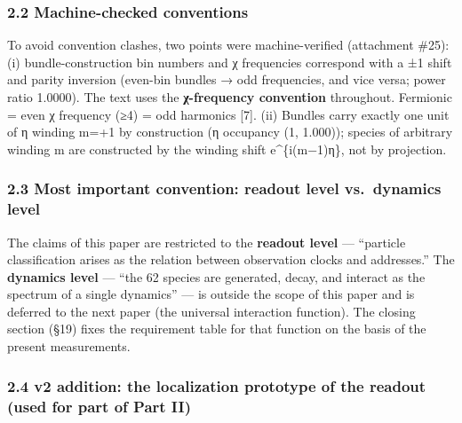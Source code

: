 \documentclass[
]{article}
\begin{document}
\subsubsection{2.2 Machine-checked
conventions}\label{machine-checked-conventions}

To avoid convention clashes, two points were machine-verified
(attachment \#25): (i) bundle-construction bin numbers and χ frequencies
correspond with a ±1 shift and parity inversion (even-bin bundles → odd
frequencies, and vice versa; power ratio 1.0000). The text uses the
\textbf{χ-frequency convention} throughout. Fermionic = even χ frequency
(≥4) = odd harmonics {[}7{]}. (ii) Bundles carry exactly one unit of η
winding m=+1 by construction (η occupancy (1, 1.000)); species of
arbitrary winding m are constructed by the winding shift
e\^{}\{i(m−1)η\}, not by projection.

\subsubsection{2.3 Most important convention: readout level vs.~dynamics
level}\label{most-important-convention-readout-level-vs.-dynamics-level}

The claims of this paper are restricted to the \textbf{readout level}
--- ``particle classification arises as the relation between observation
clocks and addresses.'' The \textbf{dynamics level} --- ``the 62 species
are generated, decay, and interact as the spectrum of a single
dynamics'' --- is outside the scope of this paper and is deferred to the
next paper (the universal interaction function). The closing section
(§19) fixes the requirement table for that function on the basis of the
present measurements.

\subsubsection{2.4 v2 addition: the localization prototype of the
readout (used for part of Part
II)}\label{v2-addition-the-localization-prototype-of-the-readout-used-for-part-of-part-ii}
\end{document}

